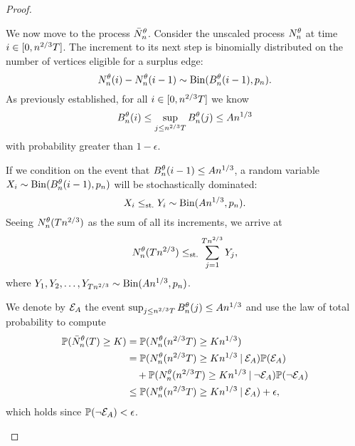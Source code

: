 \begin{proof}
\begin{proofpart}
We now move to the process $\bar{N}_n^{\theta}$. Consider the unscaled process $N_n^{\theta}$ at time $i \in [0, n^{2 / 3}T]$.
The increment to its next step is binomially distributed on the number of vertices eligible for a surplus edge:
\begin{equation}
N_n^{\theta}(i) - N_n^{\theta}(i-1) \sim \operatorname*{Bin}(B_n^{\theta}(i-1), p_n).
\end{equation}
As previously established, for all $i \in [0, n^{2 / 3}T]$ we know 
\begin{equation}
	B_n^{\theta}(i) \leq \sup_{j \leq n^{2 / 3}T} B_n^{\theta}(j) \leq An^{1 / 3}
\end{equation}
with probability greater than $1-\epsilon$.

If we condition on the event that $B_n^{\theta}(i-1) \leq An^{1 / 3}$, a random variable $X_i \sim \operatorname*{Bin}(B_n^{\theta}(i-1), p_n)$ will be stochastically dominated:
\begin{equation}
X_i \leq_{\text{st.}} Y_i \sim \operatorname*{Bin}(An^{1 / 3}, p_n).
\end{equation}
Seeing $N_n^{\theta}(Tn^{2 / 3})$ as the sum of all its increments, we arrive at
\begin{equation} \label{E: nnt stoch dominance}
N_n^{\theta}(Tn^{2 / 3}) \leq_{\text{st.}} \sum_{j=1}^{Tn^{2 / 3}} Y_j,
\end{equation}
where $Y_1, Y_2, \dots, Y_{Tn^{2 / 3}} \sim \operatorname*{Bin}(An^{1 / 3}, p_n)$.

We denote by $\mathcal{E}_{A}$ the event $\sup_{j \leq n^{2 / 3}T} B_n^{\theta}(j) \leq An^{1 / 3}$ and use the law of total probability to compute
\begin{equation} \label{E: First Total Probability Argument}
\begin{aligned}
\mathbb{P}(\bar{N}_n^{\theta}(T) \geq K) 
&= \mathbb{P}(N_n^{\theta}(n^{2 / 3}T) \geq Kn^{1 / 3}) \\
&=  \mathbb{P}(N_n^{\theta}(n^{2 / 3}T) \geq Kn^{1 / 3} \: | \: \mathcal{E}_{A}) \mathbb{P}(\mathcal{E}_{A}) \\
&\quad + \mathbb{P}(N_n^{\theta}(n^{2 / 3}T) \geq Kn^{1 / 3} \: | \: \neg\mathcal{E}_{A}) \mathbb{P}(\neg \mathcal{E}_{A}) \\
&\leq \mathbb{P}(N_n^{\theta}(n^{2 / 3}T) \geq Kn^{1 / 3} \: | \: \mathcal{E}_{A}) + \epsilon, \\
\end{aligned}	
\end{equation}
which holds since $\mathbb{P}(\neg\mathcal{E}_{A}) <\epsilon$.


\end{proofpart}
\end{proof}
